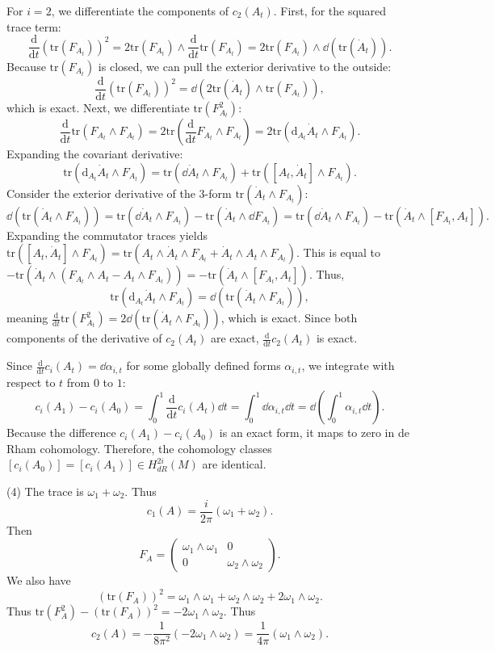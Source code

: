 \documentclass[11pt, letterpaper]{article}
\theoremstyle{plain}
\begin{document}
For $i=2$, we differentiate the components of $c_2(A_t)$. First, for the squared trace term:
\[
	\frac{\mathrm{d}}{\mathrm{d}t} (\mathrm{tr}(F_{A_t}))^2 = 2 \mathrm{tr}(F_{A_t}) \wedge \frac{\mathrm{d}}{\mathrm{d}t} \mathrm{tr}(F_{A_t}) = 2 \mathrm{tr}(F_{A_t}) \wedge \dd (\mathrm{tr}(\dot{A}_t))
.\]
Because $\mathrm{tr}(F_{A_t})$ is closed, we can pull the exterior derivative to the outside:
\[
	\frac{\mathrm{d}}{\mathrm{d}t} (\mathrm{tr}(F_{A_t}))^2 = \dd \left( 2 \mathrm{tr}(\dot{A}_t) \wedge \mathrm{tr}(F_{A_t}) \right)
,\]
which is exact. Next, we differentiate $\mathrm{tr}(F_{A_t}^2)$:
\[
	\frac{\mathrm{d}}{\mathrm{d}t} \mathrm{tr}(F_{A_t} \wedge F_{A_t}) = 2\mathrm{tr}\left( \frac{\mathrm{d}}{\mathrm{d}t} F_{A_t} \wedge F_{A_t} \right) = 2\mathrm{tr}(\mathrm{d}_{A_t} \dot{A}_t \wedge F_{A_t})
.\]
Expanding the covariant derivative:
\[
	\mathrm{tr}(\mathrm{d}_{A_t} \dot{A}_t \wedge F_{A_t}) = \mathrm{tr}(\dd \dot{A}_t \wedge F_{A_t}) + \mathrm{tr}([A_t, \dot{A}_t] \wedge F_{A_t})
.\]
Consider the exterior derivative of the 3-form $\mathrm{tr}(\dot{A}_t \wedge F_{A_t})$:
\[
	\dd (\mathrm{tr}(\dot{A}_t \wedge F_{A_t})) = \mathrm{tr}(\dd \dot{A}_t \wedge F_{A_t}) - \mathrm{tr}(\dot{A}_t \wedge \dd F_{A_t}) = \mathrm{tr}(\dd \dot{A}_t \wedge F_{A_t}) - \mathrm{tr}(\dot{A}_t \wedge [F_{A_t}, A_t])
.\]
Expanding the commutator traces yields $\mathrm{tr}([A_t, \dot{A}_t] \wedge F_{A_t}) = \mathrm{tr}(A_t \wedge \dot{A}_t \wedge F_{A_t} + \dot{A}_t \wedge A_t \wedge F_{A_t})$. This is equal to $-\mathrm{tr}(\dot{A}_t \wedge (F_{A_t} \wedge A_t - A_t \wedge F_{A_t})) = -\mathrm{tr}(\dot{A}_t \wedge [F_{A_t}, A_t])$. Thus,
\[
	\mathrm{tr}(\mathrm{d}_{A_t} \dot{A}_t \wedge F_{A_t}) = \dd (\mathrm{tr}(\dot{A}_t \wedge F_{A_t}))
,\]
meaning $\frac{\mathrm{d}}{\mathrm{d}t} \mathrm{tr}(F_{A_t}^2) = 2\dd(\mathrm{tr}(\dot{A}_t \wedge F_{A_t}))$, which is exact. Since both components of the derivative of $c_2(A_t)$ are exact, $\frac{\mathrm{d}}{\mathrm{d}t} c_2(A_t)$ is exact.


Since $\frac{\mathrm{d}}{\mathrm{d}t} c_i(A_t) = \dd \alpha_{i,t}$ for some globally defined forms $\alpha_{i,t}$, we integrate with respect to $t$ from $0$ to $1$:
\[
	c_i(A_1) - c_i(A_0) = \int_{0}^{1} \frac{\mathrm{d}}{\mathrm{d}t} c_i(A_t) \dd t = \int_{0}^{1} \dd \alpha_{i,t} \dd t = \dd \left( \int_{0}^{1} \alpha_{i,t} \dd t \right)
.\]
Because the difference $c_i(A_1) - c_i(A_0)$ is an exact form, it maps to zero in de Rham cohomology. Therefore, the cohomology classes $[c_i(A_0)] = [c_i(A_1)] \in H_{dR}^{2i}(M)$ are identical.


(4) The trace is $\omega _1 + \omega _2$. Thus
\[
	c_1(A) = \frac{i}{2\pi } (\omega _1 + \omega _2)
.\]
Then
\[
	F_A = \begin{pmatrix}
	\omega _1 \wedge \omega _1 & 0 \\
	0 & \omega _2\wedge \omega _2
	\end{pmatrix}
.\]
We also have
\[
	(\mathrm{tr} (F_A))^2 = \omega _1 \wedge \omega _1 + \omega _2 \wedge \omega _2 + 2\omega _1 \wedge \omega _2
.\]
Thus $\mathrm{tr} (F_A^2) - (\mathrm{tr} (F_A))^2 = -2\omega _1 \wedge \omega _2$. Thus
\[
	c_2(A) = -\frac{1}{8\pi ^2} \left( -2\omega _1 \wedge \omega _2 \right) =\frac{1}{4\pi } \left( \omega _1\wedge \omega _2 \right) 
.\]
\end{document}
